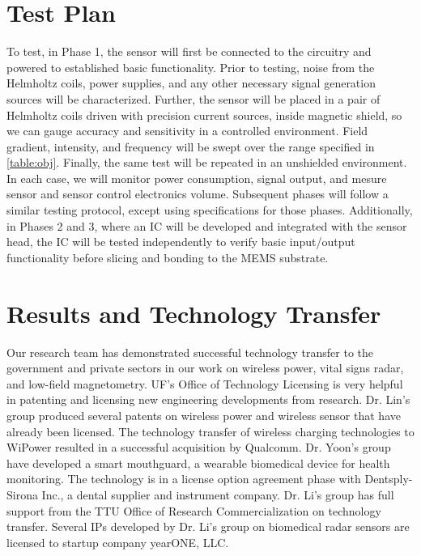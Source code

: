 \section{Test Plan}\label{sec:test}

To test, in Phase 1, the sensor will first be connected to the circuitry and powered to established basic functionality.  Prior to testing, noise from the Helmholtz coils, power supplies, and any other necessary signal generation sources will be characterized. Further, the sensor will be placed in a pair of Helmholtz coils driven with precision current sources, inside magnetic shield, so we can gauge accuracy and sensitivity in a controlled environment. Field gradient, intensity, and frequency will be swept over the range specified in \ref{table:obj}. Finally, the same test will be repeated in an unshielded environment. In each case, we will monitor power consumption, signal output, and mesure sensor and sensor control electronics volume. Subsequent phases will follow a similar testing protocol, except using specifications for those phases. Additionally, in Phases 2 and 3, where an IC will be developed and integrated with the sensor head, the IC will be tested independently to verify basic input/output functionality before slicing and bonding to the MEMS substrate.

\section{Results and Technology Transfer}

Our research team has demonstrated successful technology transfer to the government and private sectors in our work on wireless power, vital signs radar, and low-field magnetometry. UF's Office of Technology Licensing is very helpful in patenting and licensing new engineering developments from research. Dr. Lin's group produced several patents on wireless power and wireless sensor that have already been licensed. The technology transfer of wireless charging technologies to WiPower resulted in a successful acquisition by Qualcomm. Dr. Yoon's group have developed a smart mouthguard, a wearable biomedical device for health monitoring. The technology is in a license option agreement phase with Dentsply-Sirona Inc., a dental supplier and instrument company. Dr. Li’s group has full support from the TTU Office of Research Commercialization on technology transfer. Several IPs developed by Dr. Li’s group on biomedical radar sensors are licensed to startup company yearONE, LLC.

